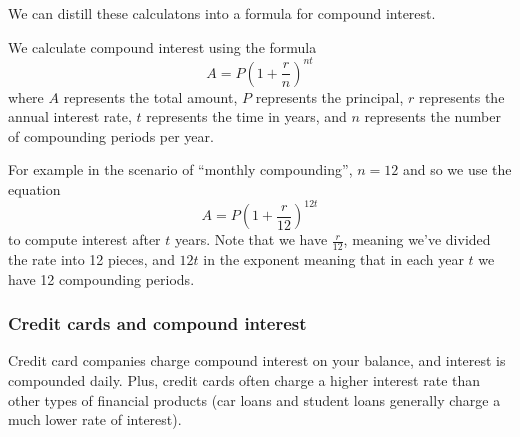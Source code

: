 
We can distill these calculatons into a formula for compound interest.

\begin{boxdef}
We calculate compound interest using the formula \[A = P\left(1+\frac{r}{n}\right)^{nt}\]
where $A$ represents the total amount, $P$ represents the principal, $r$ represents the annual interest rate, $t$ represents the time in years, and $n$ represents the number of compounding periods per year.
\end{boxdef}

For example in the scenario of ``monthly compounding'', $n=12$ and so we use the equation \[A = P\left( 1 + \frac{r}{12}\right)^{12t}\] to compute interest after $t$ years. Note that we have $\frac{r}{12}$, meaning we've divided the rate into 12 pieces, and $12t$ in the exponent meaning that in each year $t$ we have 12 compounding periods.

\subsubsection{Credit cards and compound interest}
	
Credit card companies charge compound interest on your balance, and interest is compounded daily. Plus, credit cards often charge a higher interest rate than other types of financial products (car loans and student loans generally charge a much lower rate of interest).

